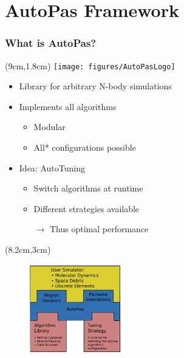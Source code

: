 \documentclass[
	10pt,
	t		%
]{beamer}
\begin{document}
\section{AutoPas Framework}

\begin{frame}
    \frametitle{What is AutoPas?}

    \begin{textblock*}{5cm}(9cm,1.8cm)
        \texttt{[image: figures/AutoPasLogo]}
    \end{textblock*}

    \begin{itemize}
        \item Library for arbitrary N-body simulations
        \item Implements all algorithms
              \begin{itemize}
                  \item Modular
                  \item All\textup{*} configurations possible
              \end{itemize}
        \item Idea: AutoTuning
              \begin{itemize}
                  \item Switch algorithms at runtime
                  \item Different strategies available
                  \item[$\rightarrow$] Thus optimal performance
              \end{itemize}
    \end{itemize}

    \begin{textblock*}{4cm}(8.2cm,3cm)
        \begin{figure}
            \includegraphics[width=4cm]{figures/AutoPasLibraryStructure.png}
            \caption{ \scriptsize{\cite{Newcome2023Poster}}}

        \end{figure}
    \end{textblock*}

\end{frame}
\end{document}
